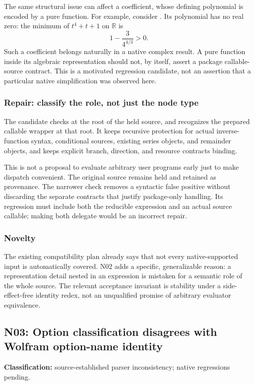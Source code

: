 \documentclass[11pt,letterpaper]{article}
\newcommand{\code}[1]{\texttt{\detokenize{#1}}}
\newcommand{\R}{\mathbb R}
\newcommand{\finding}[3]{\subsection{#1: #2}\textbf{Classification:} #3.\par}
\begin{document}
The same structural issue can affect a \code{Root} coefficient, whose defining polynomial is encoded by a pure function. For example, consider \code{Root[1 + # + #^4 &, 1]}. Its polynomial has no real zero: the minimum of $t^4+t+1$ on $\R$ is
\[
 1-\frac{3}{4^{4/3}}>0.
\]
Such a coefficient belongs naturally in a native complex result. A pure function inside its algebraic representation should not, by itself, assert a package callable-source contract. This is a motivated regression candidate, not an assertion that a particular native \code{Root} simplification was observed here.

\subsubsection*{Repair: classify the role, not just the node type}

The candidate checks \code{Function} at the root of the held source, and recognizes the prepared callable wrapper at that root. It keeps recursive protection for actual inverse-function syntax, conditional sources, existing series objects, and remainder objects, and keeps explicit branch, direction, and resource contracts binding.

This is not a proposal to evaluate arbitrary user programs early just to make dispatch convenient. The original source remains held and retained as provenance. The narrower check removes a syntactic false positive without discarding the separate contracts that justify package-only handling. Its regression must include both the reducible expression and an actual source callable; making both delegate would be an incorrect repair.

\subsubsection*{Novelty}

The existing compatibility plan already says that not every native-supported input is automatically covered. N02 adds a specific, generalizable reason: a representation detail nested in an expression is mistaken for a semantic role of the whole source. The relevant acceptance invariant is stability under a side-effect-free identity redex, not an unqualified promise of arbitrary evaluator equivalence.

\finding{N03}{Option classification disagrees with Wolfram option-name identity}{source-established parser inconsistency; native regressions pending}
\end{document}
